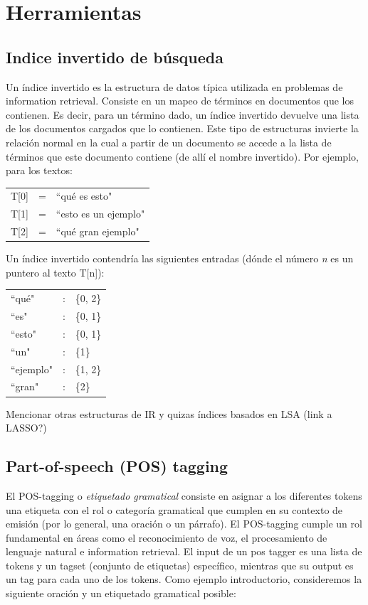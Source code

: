 \section{Herramientas}
\label{sec:herramientas}

\subsection{Indice invertido de búsqueda}
Un índice invertido es la estructura de datos típica utilizada en problemas de information retrieval. Consiste en un mapeo de términos en documentos que los contienen. Es decir, para un término dado, un índice invertido devuelve una lista de los documentos cargados que lo contienen. Este tipo de estructuras invierte la relación normal en la cual a partir de un documento se accede a la lista de términos que este documento contiene (de allí el nombre invertido).
Por ejemplo, para los textos:
\medskip

\begin{tabular}{lll}
T[0] & = & ``qué es esto" \\
T[1] & = & ``esto es un ejemplo" \\
T[2] & = & ``qué gran ejemplo" \\
\end{tabular}
\medskip

Un índice invertido contendría las siguientes entradas (dónde el número \textit{n} es un puntero al texto T[n]):
\medskip %

\begin{tabular}{lll}
	``qué" & : & \{0, 2\}\\
	``es" &:& \{0, 1\}\\
	``esto" & :& \{0, 1\} \\
	``un" & :&   \{1\} \\
	``ejemplo" & :& \{1, 2\} \\
	``gran" & :& \{2\} \\
\end{tabular}
\medskip

{\color{red} Mencionar otras estructuras de IR y quizas índices basados en LSA (link a LASSO?)}



\subsection{Part-of-speech (POS) tagging}
\label{subsec:pos}
El POS-tagging o \textit{etiquetado gramatical} consiste en asignar a los diferentes 
tokens una etiqueta con el rol o categoría gramatical que cumplen en su contexto de emisión (por lo general, una oración o un párrafo). 
El POS-tagging cumple un rol fundamental en áreas como el reconocimiento de voz, el procesamiento de lenguaje natural e information retrieval.
El input de un pos tagger es una lista de tokens y un tagset (conjunto de etiquetas) específico, mientras que su output es un tag para cada uno 
de los tokens. Como ejemplo introductorio, consideremos la siguiente oración y un etiquetado gramatical posible:


